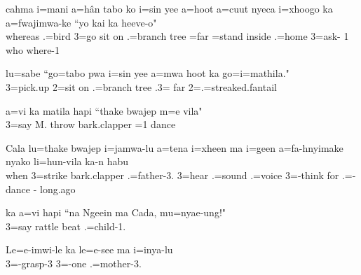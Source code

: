 \ea
\gll cahma i=mani a=hân tabo ko i=sin yee a=hoot a=cuut nyeca i=xhoogo ka a=fwajimwa-ke ``yo kai ka heeve-o"\\ whereas .=bird 3=go sit on .=branch tree =far =stand inside .=home  3=ask- 1 who  where-1\\ \glt {}
\z

\ea
\gll lu=sabe ``go=tabo pwa i=sin yee a=mwa hoot ka go=i=mathila."\\ 3=pick.up 2=sit on .=branch tree .3= far  2=.=streaked.fantail\\ \glt {}
\z

\ea
\gll a=vi ka matila hapi ``thake bwajep m=e vila"\\ 3=say  M.  throw bark.clapper =1 dance\\ \glt {}
\z

\ea
\gll Cala lu=thake bwajep i=jamwa-lu a=tena i=xheen ma i=geen a=fa-hnyimake nyako li=hun-vila ka-n habu\\ 
     when 3=strike bark.clapper .=father-3. 3=hear .=sound  .=voice 3=-think for .=-dance - long.ago\\ \glt {}
\z

\ea
\gll ka a=vi hapi ``na Ngeein ma Cada, mu=nyae-ung!"\\  
     3=say   rattle  beat .=child-1.\\ 
    \glt {}
\z

\ea
\gll Le=e-imwi-le ka le=e-see ma i=inya-lu\\ 
    3=-grasp-3  3=-one  .=mother-3.\\ 
\glt {}
\z

